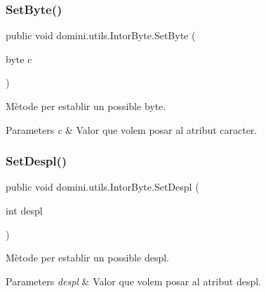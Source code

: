 \subsubsection{\texorpdfstring{Set\+Byte()}{SetByte()}}
{\footnotesize\ttfamily public void domini.\+utils.\+Intor\+Byte.\+Set\+Byte (\begin{DoxyParamCaption}\item[{byte}]{c }\end{DoxyParamCaption})\hspace{0.3cm}{\ttfamily [inline]}}



Mètode per establir un possible byte. 


\begin{DoxyParams}{Parameters}
{\em c} & Valor que volem posar al atribut caracter. \\
\hline
\end{DoxyParams}
\mbox{\label{classdomini_1_1utils_1_1IntorByte_a01c26f8a3a94b2bc31fda2f5989fca00}} 
\subsubsection{\texorpdfstring{Set\+Despl()}{SetDespl()}}
{\footnotesize\ttfamily public void domini.\+utils.\+Intor\+Byte.\+Set\+Despl (\begin{DoxyParamCaption}\item[{int}]{despl }\end{DoxyParamCaption})\hspace{0.3cm}{\ttfamily [inline]}}



Mètode per establir un possible despl. 


\begin{DoxyParams}{Parameters}
{\em despl} & Valor que volem posar al atribut despl. \\
\hline
\end{DoxyParams}
\mbox{\label{classdomini_1_1utils_1_1IntorByte_a2371fca6d26baf4098466dbb3089052d}} 
